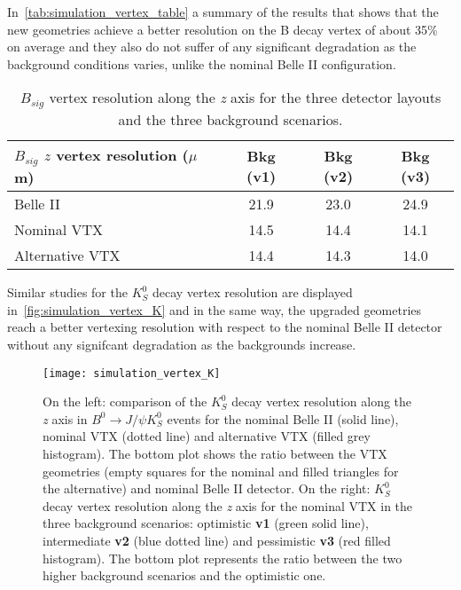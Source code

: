 In~\autoref{tab:simulation_vertex_table} a summary of the results that shows that the new geometries achieve a better resolution on the B decay vertex of about 35\% on average and they also do not suffer of any significant degradation as the background conditions varies, unlike the nominal Belle II configuration.

\begin{table}[htbp]
  \begin{center}
    \begin{tabular}{l|c|c|c}
      \hline\hline
      $B_{sig}$ $z$ vertex resolution ($\mu$m) & Bkg (v1) & Bkg (v2) & Bkg (v3) \\
      \hline\hline
      Belle II & 21.9 & 23.0 & 24.9 \\
      \hline
      Nominal VTX & 14.5 & 14.4 & 14.1 \\
      \hline
      Alternative VTX & 14.4 & 14.3 & 14.0 \\
      \hline\hline
    \end{tabular}
  \end{center}
\caption{$B_{sig}$ vertex resolution along the \textit{z} axis for the three detector layouts and the three background scenarios.}
\label{tab:simulation_vertex_table}
\end{table}


Similar studies for the $K_{S}^{0}$ decay vertex resolution are displayed in~\autoref{fig:simulation_vertex_K} and in the same way, the upgraded geometries reach a better vertexing resolution with respect to the nominal Belle II detector without any signifcant degradation as the backgrounds increase.

\begin{figure}[h!]
\centering
\texttt{[image: simulation\_vertex\_K]}
\caption{On the left: comparison of the $K_{S}^{0}$ decay vertex resolution along the \textit{z} axis in $B^{0} \rightarrow J/\psi K_{S}^{0}$ events for the nominal Belle II (solid line), nominal VTX (dotted line) and alternative VTX (filled grey histogram). The bottom plot shows the ratio between the VTX geometries (empty squares for the nominal and filled triangles for the alternative) and nominal Belle II detector. 
On the right: $K_{S}^{0}$ decay vertex resolution along the \textit{z} axis for the nominal VTX in the three background scenarios: optimistic \textbf{v1} (green solid line), intermediate \textbf{v2} (blue dotted line) and pessimistic \textbf{v3} (red filled histogram). The bottom plot represents the ratio between the two higher background scenarios and the optimistic one.}
\label{fig:simulation_vertex_K}
\end{figure}

